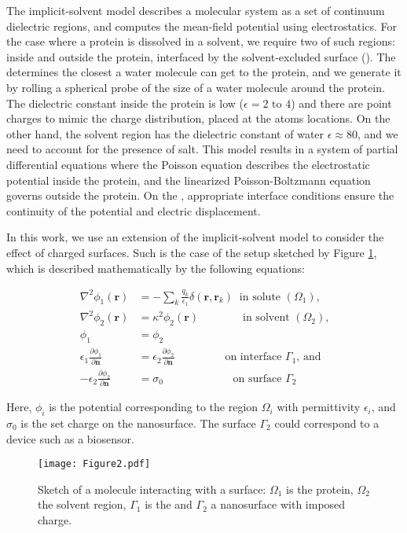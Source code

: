 
The implicit-solvent model describes a molecular system as a set of continuum dielectric regions, and computes the mean-field potential using electrostatics. For the case where a protein is dissolved in a solvent, we require two of such regions: inside and outside the protein, interfaced by the solvent-excluded surface (\ses). The \ses determines the closest a water molecule can get to the protein, and we generate it by rolling a spherical probe of the size of a water molecule around the protein. The dielectric constant inside the protein is low ($\epsilon= 2\text{ to }4$) and there are point charges to mimic the charge distribution, placed at the atoms locations. On the other hand, the solvent region has the dielectric constant of water $\epsilon \approx 80$, and we need to account for the presence of salt. This model results in a system of partial differential equations where the Poisson equation describes the electrostatic potential inside the protein, and the linearized Poisson-Boltzmann equation governs outside the protein. On the \ses, appropriate interface conditions ensure the continuity of the potential and electric displacement.

In this work, we use an extension of the implicit-solvent model to consider the effect of charged surfaces. Such is the case of the setup sketched by Figure \ref{fig:molecule_surface}, which is described mathematically by the following equations:


\begin{align} \label{eq:pde}
\nabla^2 \phi_1(\mathbf{r}) &= - \sum_k \frac{q_k}{\epsilon_1} \delta(\mathbf{r},\mathbf{r}_k) \ \text{ in solute $(\Omega_1)$,}  \nonumber \\ 
\nabla^2\phi_2 (\mathbf{r}) &= \kappa^2 \phi_2(\mathbf{r}) \quad \qquad \ \ \ \text{ in solvent $(\Omega_2)$,}  \nonumber \\ 
\phi_1 &=\phi_2 \nonumber \\ 
\epsilon_1 \frac{\partial \phi_1}{\partial \mathbf{n}} &= \epsilon_2 \frac{\partial \phi_2}{\partial \mathbf{n}}  \ \qquad \qquad \text{ on interface $\Gamma_1$, and} \nonumber \\
-\epsilon_2 \frac{\partial \phi_2}{\partial \mathbf{n}} &= \sigma_0 \qquad \qquad \qquad \text{ on surface $\Gamma_2$} 
\end{align}

\noindent Here, $\phi_i$ is the potential corresponding to the region $\Omega_i$ with permittivity $\epsilon_i$, and $\sigma_0$ is the set charge on the nanosurface. The surface $\Gamma_2$ could correspond to a device such as a biosensor.

\begin{figure}
   \texttt{[image: Figure2.pdf]} 
   \caption{Sketch of a molecule interacting with a surface: $\Omega_1$ is the protein, $\Omega_2$ the solvent region, $\Gamma_1$ is the  \ses and $\Gamma_2$ a nanosurface with imposed charge.}
   \label{fig:molecule_surface}
\end{figure}
